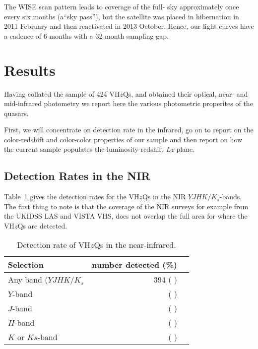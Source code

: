 \documentclass[usenatbib]{mnras}
\begin{document}
The WISE scan pattern leads to coverage of the full- sky approximately
once every six months (a``sky pass''), but the satellite was placed in
hibernation in 2011 February and then reactivated in 2013
October. Hence, our light curves have a cadence of 6 months with a 32
month sampling gap.



\section{Results}
Having collated the sample of 424 VH$z$Qs, and obtained their optical,
near- and mid-infrared photometry we report here the various
photometric properites of the quasars.

First, we will concentrate on detection rate in the infrared, go on to
report on the color-redshift and color-color properties of our sample
and then report on how the current sample populates the
luminosity-redshift $Lz$-plane.


    \subsection{Detection Rates in the NIR}
    Table~\ref{tab:nir_detection} gives the detection rates for the 
    VH$z$Qs in the NIR $YJHK/K_{s}$-bands. 
    The first thing to note is that the coverage of the NIR surveys 
    for example from the UKIDSS LAS and VISTA VHS, does
    not overlap the full area for where the VH$z$Qs are detected. 

    \begin{table}
          \centering

      \begin{tabular}{l r l}
        \hline  \hline
        Selection   & number detected (\%) \\
        \hline  
        Any band ($YJHK/K_{s}$   &  394  ( ) \\
        $Y$-band    &    ( ) \\
        $J$-band    &    ( ) \\
        $H$-band    &    ( ) \\
        $K$ or $Ks$-band    &    ( ) \\
        \hline  \hline
      \end{tabular}
      \caption{Detection rate of VH$z$Qs in the near-infrared.}
      \label{tab:nir_detection}
    \end{table}
\end{document}
